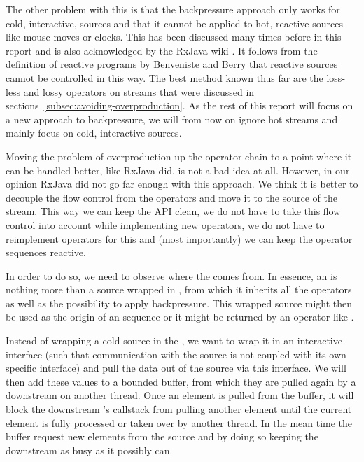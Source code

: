 The other problem with this is that the backpressure approach only works for cold, interactive, sources and that it cannot be applied to hot, reactive sources like mouse moves or clocks. This has been discussed many times before in this report and is also acknowledged by the RxJava wiki \cite{RxJava-Wiki-HotCold}. It follows from the definition of reactive programs by Benveniste and Berry that reactive sources cannot be controlled in this way. The best method known thus far are the loss-less and lossy operators on streams that were discussed in sections~\ref{subsec:avoiding-overproduction}. As the rest of this report will focus on a new approach to backpressure, we will from now on ignore hot streams and mainly focus on cold, interactive sources.

Moving the problem of overproduction up the operator chain to a point where it can be handled better, like RxJava did, is not a bad idea at all. However, in our opinion RxJava did not go far enough with this approach. We think it is better to decouple the flow control from the operators and move it to the source of the stream. This way we can keep the API clean, we do not have to take this flow control into account while implementing new operators, we do not have to reimplement operators for this and (most importantly) we can keep the operator sequences reactive.

In order to do so, we need to observe where the \obs comes from. In essence, an \obs is nothing more than a source wrapped in , from which it inherits all the operators as well as the possibility to apply backpressure. This wrapped source might then be used as the origin of an \obs sequence or it might be returned by an operator like .

Instead of wrapping a cold source in the , we want to wrap it in an interactive interface (such that communication with the source is not coupled with its own specific interface) and pull the data out of the source via this interface. We will then add these values to a bounded buffer, from which they are pulled again by a downstream \obs on another thread. Once an element is pulled from the buffer, it will block the downstream \obs's callstack from pulling another element until the current element is fully processed or taken over by another thread. In the mean time the buffer request new elements from the source and by doing so keeping the downstream \obs as busy as it possibly can.


